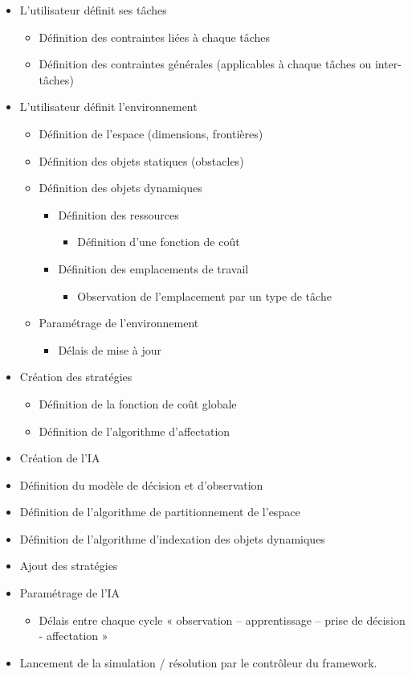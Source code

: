 \begin{itemize}
\setlength{\itemsep}{5pt}
\item L'utilisateur définit ses tâches
	\begin{itemize}
	\item Définition des contraintes liées à chaque tâches
	\item Définition des contraintes générales (applicables à chaque tâches ou inter-tâches)
	\end{itemize}
\item L'utilisateur définit l'environnement
	\begin{itemize}
	\item Définition de l'espace (dimensions, frontières)
	\item Définition des objets statiques (obstacles)
	\item Définition des objets dynamiques
		\begin{itemize}
		\item Définition des ressources
			\begin{itemize}
			\item Définition d'une fonction de coût
			\end{itemize}
		\item Définition des emplacements de travail
			\begin{itemize}
			\item Observation de l'emplacement par un type de tâche
			\end{itemize}
		\end{itemize}
	\item Paramétrage de l'environnement
		\begin{itemize}
		\item Délais de mise à jour
		\end{itemize}
	\end{itemize}
\item Création des stratégies
	\begin{itemize}
	\item Définition de la fonction de coût globale
	\item Définition de l'algorithme d'affectation
	\end{itemize}
\item Création de l'IA
\item Définition du modèle de décision et d'observation
\item Définition de l'algorithme de partitionnement de l'espace
\item Définition de l'algorithme d'indexation des objets dynamiques
\item Ajout des stratégies
\item Paramétrage de l'IA
	\begin{itemize}
	\item Délais entre chaque cycle « observation – apprentissage – prise de décision - affectation »
	\end{itemize}
\item Lancement de la simulation / résolution par le contrôleur du framework.
\end{itemize} %


